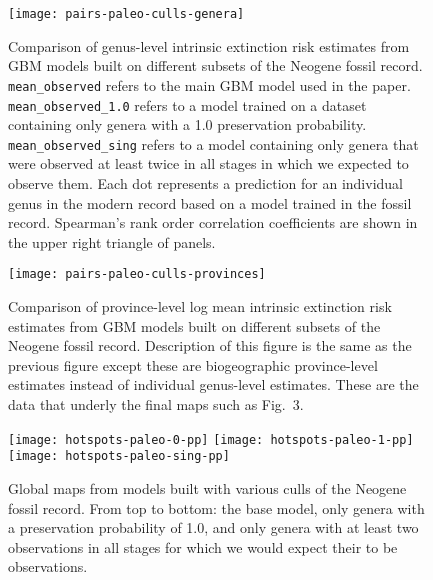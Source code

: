 \documentclass[11pt]{article}
\begin{document}
\begin{figure}[htbp]
\begin{center}
\texttt{[image: pairs-paleo-culls-genera]}
\caption{Comparison of genus-level intrinsic extinction risk estimates from GBM models built on different subsets of the Neogene fossil record. \texttt{mean\_observed} refers to the main GBM model used in the paper. \texttt{mean\_observed\_1.0} refers to a model trained on a dataset containing only genera with a 1.0 preservation probability. \texttt{mean\_observed\_sing} refers to a model containing only genera that were observed at least twice in all stages in which we expected to observe them. Each dot represents a prediction for an individual genus in the modern record based on a model trained in the fossil record. Spearman's rank order correlation coefficients are shown in the upper right triangle of panels.}
\label{fig:pairs-genus-paleo-culls}
\end{center}
\end{figure}

\clearpage

\begin{figure}[htbp]
\begin{center}
\texttt{[image: pairs-paleo-culls-provinces]}
\caption{Comparison of province-level log mean intrinsic extinction risk estimates from GBM models built on different subsets of the Neogene fossil record. Description of this figure is the same as the previous figure except these are biogeographic province-level estimates instead of individual genus-level estimates. These are the data that underly the final maps such as Fig.~3.}
\label{fig:pairs-prov-paleo-culls}
\end{center}
\end{figure}

\clearpage

\begin{figure}[htbp]
\begin{center}
\texttt{[image: hotspots-paleo-0-pp]}
\texttt{[image: hotspots-paleo-1-pp]}
\texttt{[image: hotspots-paleo-sing-pp]}
\caption{Global maps from models built with various culls of the Neogene fossil record. From top to bottom: the base model, only genera with a preservation probability of 1.0, and only genera with at least two observations in all stages for which we would expect their to be observations.}
\label{fig:overall-maps-paleo-culls}
\end{center}
\end{figure}
\end{document}
